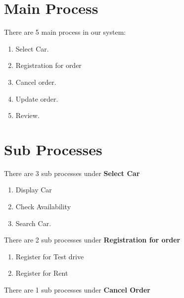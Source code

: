 \noindent 

\noindent 

\noindent 

\section{Main Process}

\noindent There are 5 main process in our system:

\begin{enumerate}
\item  Select Car.

\item  Registration for order

\item  Cancel order.

\item  Update order.

\item  Review.

\end{enumerate}

\noindent 
\section{Sub Processes}

\noindent There are 3 sub processes under \textbf{Select Car}

\begin{enumerate}
\item  Display Car

\item  Check Availability

\item  Search Car.

\end{enumerate}

\noindent 

\noindent There are 2 sub processes under \textbf{Registration for order}

\begin{enumerate}
\item  Register for Test drive 

\item  Register for Rent


\end{enumerate}

\noindent 

\noindent There are 1 sub processes under \textbf{Cancel Order}

